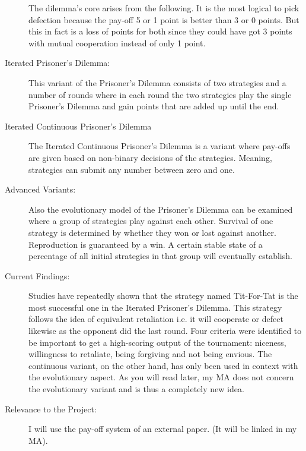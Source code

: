 \documentclass{article}
\begin{document}
\begin{description}
The dilemma's core arises from the following. It is the most logical to pick defection because the pay-off 5 or 1 point is better than 3 or 0 points. But this in fact is a loss of points for both since they could have got 3 points with mutual cooperation instead of only 1 point. 
		\item[Iterated Prisoner's Dilemma:] This variant of the Prisoner's Dilemma consists of two strategies and a number of rounds where in each round the two strategies play the single Prisoner's Dilemma and gain points that are added up until the end.
		\item[Iterated Continuous Prisoner's Dilemma] The Iterated Continuous Prisoner's Dilemma is a variant where pay-offs are given based on non-binary decisions of the strategies. Meaning, strategies can submit any number between zero and one.
		\item[Advanced Variants:]
Also the evolutionary model of the Prisoner's Dilemma can be examined where a group of strategies play against each other. Survival of one strategy is determined by whether they won or lost against another. Reproduction is guaranteed by a win. A certain stable state of a percentage of all initial strategies in that group will eventually establish.
		\item[Current Findings:] Studies have repeatedly shown that the strategy named Tit-For-Tat is the most successful one in the Iterated Prisoner's Dilemma. This strategy follows the idea of equivalent retaliation i.e. it will cooperate or defect likewise as the opponent did the last round. Four criteria were identified to be important to get a high-scoring output of the tournament: niceness, willingness to retaliate, being forgiving and not being envious. The continuous variant, on the other hand, has only been used in context with the evolutionary aspect. As you will read later, my MA does not concern the evolutionary variant and is thus a completely new idea.
		\item[Relevance to the Project:] I will use the pay-off system of an external paper. (It will be linked in my MA).  
	\end{description}
\end{document}
